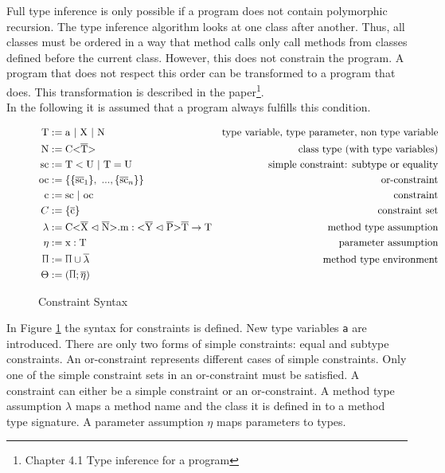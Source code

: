 Full type inference is only possible if a program does not contain polymorphic recursion.
The type inference algorithm looks at one class after another. Thus, all classes must be ordered in a way that method calls only call methods from classes defined before the current class.
However, this does not constrain the program. A program that does not respect this order can be transformed to a program that does.
This transformation is described in the paper\footnote{Chapter 4.1 Type inference for a program}.
\\
In the following it is assumed that a program always fulfills this condition.

\begin{figure}[tp]
    \begin{align*}
        \text{T} &:= \text{a} \ | \ \text{X} \ | \ \text{N} &\text{type variable, type parameter, non type variable} \\
        \text{N} &:= \text{C} \vv{\ot{T}} &\text{class type (with type variables)}\\
        \text{sc} &:= \text{T} < \text{U} \ | \ \text{T} = \text{U} &\text{simple constraint: subtype or equality}\\
        \text{oc} &:= \{ \{ \ot{sc}_1 \}, \ ..., \{ \ot{sc}_n \} \} &\text{or-constraint}\\
        \text{c} &:= \text{sc} \ | \ \text{oc} &\text{constraint}\\
        C &:= \{ \ot{c} \} &\text{constraint set}\\
        \lambda &:= \cm : \yp \oto{\text{T}} &\text{method type assumption}\\
        \eta &:= \text{x} : \text{T} &\text{parameter assumption}\\
        \sprod{0.7} &:= \sprod{0.7} \cup \overline{\lambda} &\text{method type environment}\\
        \Theta &:= ( \sprod{0.7}; \overline{\eta} )
    \end{align*}
    \caption{Constraint Syntax}
    \label{constraint_syntax}
\end{figure}

In Figure \ref{constraint_syntax} the syntax for constraints is defined. New type variables \verb|a| are introduced. There are only two forms of simple constraints: equal and subtype constraints. An or-constraint represents different cases of simple constraints. Only one of the simple constraint sets in an or-constraint must be satisfied.
A constraint can either be a simple constraint or an or-constraint. A method type assumption $\lambda$ maps a method name and the class it is defined in to a method type signature. A parameter assumption $\eta$ maps parameters to types.

